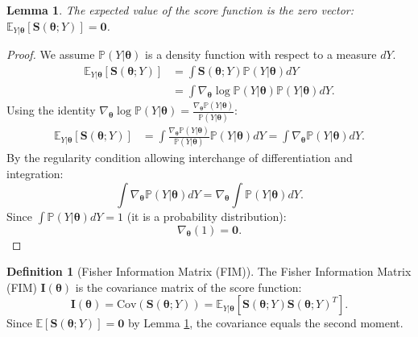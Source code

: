 \documentclass{article}
\newtheorem{lemma}[theorem]{Lemma}
\theoremstyle{definition}
\newtheorem{definition}[theorem]{Definition}
\begin{document}
\begin{lemma}
\label{lemma:score_zero}
The expected value of the score function is the zero vector: $\mathbb{E}_{Y|\boldsymbol{\theta}}[\mathbf{S}(\boldsymbol{\theta}; Y)] = \mathbf{0}$.
\end{lemma}
\begin{proof}
We assume $\mathbb{P}(Y|\boldsymbol{\theta})$ is a density function with respect to a measure $dY$.
\begin{align}
    \mathbb{E}_{Y|\boldsymbol{\theta}}[\mathbf{S}(\boldsymbol{\theta}; Y)] &= \int \mathbf{S}(\boldsymbol{\theta}; Y) \mathbb{P}(Y|\boldsymbol{\theta}) dY \\
    &= \int \nabla_{\boldsymbol{\theta}} \log \mathbb{P}(Y|\boldsymbol{\theta}) \mathbb{P}(Y|\boldsymbol{\theta}) dY.
\end{align}
Using the identity $\nabla_{\boldsymbol{\theta}} \log \mathbb{P}(Y|\boldsymbol{\theta}) = \frac{\nabla_{\boldsymbol{\theta}} \mathbb{P}(Y|\boldsymbol{\theta})}{\mathbb{P}(Y|\boldsymbol{\theta})}$:
\begin{align}
    \mathbb{E}_{Y|\boldsymbol{\theta}}[\mathbf{S}(\boldsymbol{\theta}; Y)] &= \int \frac{\nabla_{\boldsymbol{\theta}} \mathbb{P}(Y|\boldsymbol{\theta})}{\mathbb{P}(Y|\boldsymbol{\theta})} \mathbb{P}(Y|\boldsymbol{\theta}) dY = \int \nabla_{\boldsymbol{\theta}} \mathbb{P}(Y|\boldsymbol{\theta}) dY.
\end{align}
By the regularity condition allowing interchange of differentiation and integration:
\begin{equation}
    \int \nabla_{\boldsymbol{\theta}} \mathbb{P}(Y|\boldsymbol{\theta}) dY = \nabla_{\boldsymbol{\theta}} \int \mathbb{P}(Y|\boldsymbol{\theta}) dY.
\end{equation}
Since $\int \mathbb{P}(Y|\boldsymbol{\theta}) dY = 1$ (it is a probability distribution):
\begin{equation}
    \nabla_{\boldsymbol{\theta}} (1) = \mathbf{0}.
\end{equation}
\end{proof}

\begin{definition}[Fisher Information Matrix (FIM)]
The Fisher Information Matrix (FIM) $\mathbf{I}(\boldsymbol{\theta})$ is the covariance matrix of the score function:
\begin{equation}
    \mathbf{I}(\boldsymbol{\theta}) = \text{Cov}(\mathbf{S}(\boldsymbol{\theta}; Y)) = \mathbb{E}_{Y|\boldsymbol{\theta}}[\mathbf{S}(\boldsymbol{\theta}; Y) \mathbf{S}(\boldsymbol{\theta}; Y)^T].
\end{equation}
Since $\mathbb{E}[\mathbf{S}(\boldsymbol{\theta}; Y)] = \mathbf{0}$ by Lemma \ref{lemma:score_zero}, the covariance equals the second moment.
\end{definition}
\end{document}
